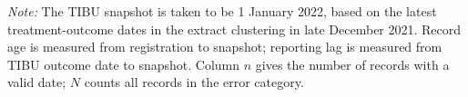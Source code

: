 \newsavebox{\CorrLagBox}
\begin{minipage}{\wd\CorrLagBox}
\usebox{\CorrLagBox}
\par\vspace{4pt}\noindent
\scriptsize{\textit{Note:} The TIBU snapshot is taken to be 1 January 2022, based on the latest treatment-outcome dates in the extract clustering in late December 2021. Record age is measured from registration to snapshot; reporting lag is measured from TIBU outcome date to snapshot. Column $n$ gives the number of records with a valid date; $N$ counts all records in the error category.}
\end{minipage}